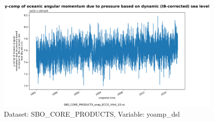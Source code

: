 \begin{figure}[H]
\centering
\includegraphics[scale=0.55]{../images/plots/oneD_plots/SBO_Core_Products/yoamp_dsl.png}
\caption{Dataset: SBO\_CORE\_PRODUCTS, Variable: yoamp\_dsl}
\label{tab:table-SBO_CORE_PRODUCTS_yoamp_dsl-Plot}
\end{figure}
\newpage
\pagebreak
